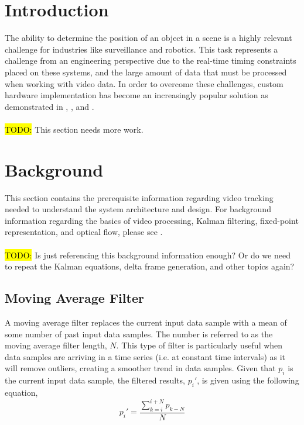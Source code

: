 \documentclass[11pt]{article} %
\begin{document}
\section{Introduction}
The ability to determine the position of an object in a scene is a highly relevant challenge for industries like surveillance and robotics. This task represents a challenge from an engineering perspective due to the real-time timing constraints placed on these systems, and the large amount of data that must be processed when working with video data. In order to overcome these challenges, custom hardware implementation has become an increasingly popular solution as demonstrated in \cite{1}, \cite{2}, and \cite{3}. \\\\
\hl{TODO:} This section needs more work.
\section{Background}
This section contains the prerequisite information regarding video tracking needed to understand the system architecture and design. For background information regarding the basics of video processing, Kalman filtering, fixed-point representation, and optical flow, please see \cite{phase1}. \\\\
\hl{TODO:} Is just referencing this background information enough? Or do we need to repeat the Kalman equations, delta frame generation, and other topics again?
\subsection{Moving Average Filter}
A moving average filter replaces the current input data sample with a mean of some number of past input data samples. The number is referred to as the moving average filter length, $N$. This type of filter is particularly useful when data samples are arriving in a time series (i.e. at constant time intervals) as it will remove outliers, creating a smoother trend in data samples. Given that $p_i$ is the current input data sample, the filtered results, $p_i'$, is given using the following equation,
\begin{equation}
p_i' = \frac{\sum_{k = i}^{i + N} p_{k-N}}{N}
\end{equation}
\end{document}
